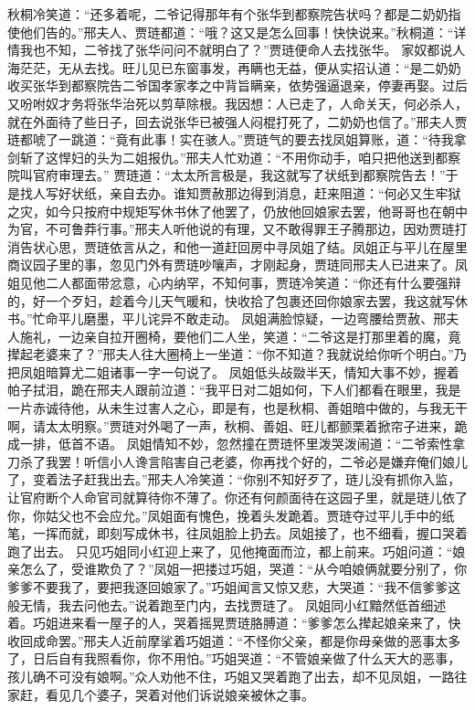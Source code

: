 \documentclass[12pt,oneside]{book}
\begin{document}
秋桐冷笑道：“还多着呢，二爷记得那年有个张华到都察院告状吗？都是二奶奶指使他们告的。”邢夫人、贾琏都道：“哦？这又是怎么回事！快快说来。”秋桐道：“详情我也不知，二爷找了张华问问不就明白了？”贾琏便命人去找张华。
家奴都说人海茫茫，无从去找。旺儿见已东窗事发，再瞒也无益，便从实招认道：“是二奶奶收买张华到都察院告二爷国孝家孝之中背旨瞒亲，依势强逼退亲，停妻再娶。过后又吩咐奴才务将张华治死以剪草除根。我因想：人已走了，人命关天，何必杀人，就在外面待了些日子，回去说张华已被强人闷棍打死了，二奶奶也信了。”邢夫人贾琏都唬了一跳道：“竟有此事！实在骇人。”贾琏气的要去找凤姐算账，道：“待我拿剑斩了这悍妇的头为二姐报仇。”邢夫人忙劝道：“不用你动手，咱只把他送到都察院叫官府审理去。”
贾琏道：“太太所言极是，我这就写了状纸到都察院告去！”于是找人写好状纸，亲自去办。谁知贾赦那边得到消息，赶来阻道：“何必又生牢狱之灾，如今只按府中规矩写休书休了他罢了，仍放他回娘家去罢，他哥哥也在朝中为官，不可鲁莽行事。”邢夫人听他说的有理，又不敢得罪王子腾那边，因劝贾琏打消告状心思，贾琏依言从之，和他一道赶回房中寻凤姐了结。凤姐正与平儿在屋里商议园子里的事，忽见门外有贾琏吵嚷声，才刚起身，贾琏同邢夫人已进来了。凤姐见他二人都面带忿意，心内纳罕，不知何事，贾琏冷笑道：“你还有什么要强辩的，好一个歹妇，趁着今儿天气暖和，快收拾了包裹还回你娘家去罢，我这就写休书。”忙命平儿磨墨，平儿诧异不敢走动。
凤姐满脸惊疑，一边弯腰给贾赦、邢夫人施礼，一边亲自拉开圈椅，要他们二人坐，笑道：“二爷这是打那里着的魔，竟撵起老婆来了？”邢夫人往大圈椅上一坐道：“你不知道？我就说给你听个明白。”乃把凤姐暗算尤二姐诸事一字一句说了。
凤姐低头敁敠半天，情知大事不妙，握着帕子拭泪，跪在邢夫人跟前泣道：“我平日对二姐如何，下人们都看在眼里，我是一片赤诚待他，从未生过害人之心，即是有，也是秋桐、善姐暗中做的，与我无干啊，请太太明察。”贾琏对外喝了一声，秋桐、善姐、旺儿都颤栗着掀帘子进来，跪成一排，低首不语。
凤姐情知不妙，忽然撞在贾琏怀里泼哭泼闹道：“二爷索性拿刀杀了我罢！听信小人谗言陷害自己老婆，你再找个好的，二爷必是嫌弃俺们娘儿了，变着法子赶我出去。”邢夫人冷笑道：“你别不知好歹了，琏儿没有抓你入监，让官府断个人命官司就算待你不薄了。你还有何颜面待在这园子里，就是琏儿依了你，你姑父也不会应允。”凤姐面有愧色，挽着头发跪着。贾琏夺过平儿手中的纸笔，一挥而就，即刻写成休书，往凤姐脸上扔去。凤姐接了，也不细看，握口哭着跑了出去。
只见巧姐同小红迎上来了，见他掩面而泣，都上前来。巧姐问道：“娘亲怎么了，受谁欺负了？”凤姐一把搂过巧姐，哭道：“从今咱娘俩就要分别了，你爹爹不要我了，要把我逐回娘家了。”巧姐闻言又惊又悲，大哭道：“我不信爹爹这般无情，我去问他去。”说着跑至门内，去找贾琏了。
凤姐同小红黯然低首细述着。巧姐进来看一屋子的人，哭着摇晃贾琏胳膊道：“爹爹怎么撵起娘亲来了，快收回成命罢。”邢夫人近前摩挲着巧姐道：“不怪你父亲，都是你母亲做的恶事太多了，日后自有我照看你，你不用怕。”巧姐哭道：“不管娘亲做了什么天大的恶事，孩儿确不可没有娘啊。”众人劝他不住，巧姐又哭着跑了出去，却不见凤姐，一路往家赶，看见几个婆子，哭着对他们诉说娘亲被休之事。
\end{document}
